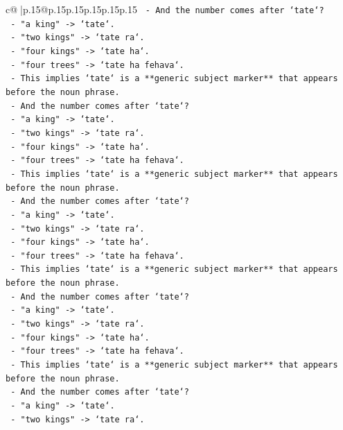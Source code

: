 \documentclass{article}
\begin{document}
{\begin{supertabular}{c@{$\;$}|p{.15\linewidth}@{}p{.15\linewidth}p{.15\linewidth}p{.15\linewidth}p{.15\linewidth}p{.15\linewidth}}
{{{\texttt{    {-} And the number comes after `tate`?} \\
\texttt{    {-} "a king" {-}> `tate`.} \\
\texttt{    {-} "two kings" {-}> `tate ra`.} \\
\texttt{    {-} "four kings" {-}> `tate ha`.} \\
\texttt{    {-} "four trees" {-}> `tate ha fehava`.} \\
\texttt{    {-} This implies `tate` is a **generic subject marker** that appears before the noun phrase.} \\
\texttt{    {-} And the number comes after `tate`?} \\
\texttt{    {-} "a king" {-}> `tate`.} \\
\texttt{    {-} "two kings" {-}> `tate ra`.} \\
\texttt{    {-} "four kings" {-}> `tate ha`.} \\
\texttt{    {-} "four trees" {-}> `tate ha fehava`.} \\
\texttt{    {-} This implies `tate` is a **generic subject marker** that appears before the noun phrase.} \\
\texttt{    {-} And the number comes after `tate`?} \\
\texttt{    {-} "a king" {-}> `tate`.} \\
\texttt{    {-} "two kings" {-}> `tate ra`.} \\
\texttt{    {-} "four kings" {-}> `tate ha`.} \\
\texttt{    {-} "four trees" {-}> `tate ha fehava`.} \\
\texttt{    {-} This implies `tate` is a **generic subject marker** that appears before the noun phrase.} \\
\texttt{    {-} And the number comes after `tate`?} \\
\texttt{    {-} "a king" {-}> `tate`.} \\
\texttt{    {-} "two kings" {-}> `tate ra`.} \\
\texttt{    {-} "four kings" {-}> `tate ha`.} \\
\texttt{    {-} "four trees" {-}> `tate ha fehava`.} \\
\texttt{    {-} This implies `tate` is a **generic subject marker** that appears before the noun phrase.} \\
\texttt{    {-} And the number comes after `tate`?} \\
\texttt{    {-} "a king" {-}> `tate`.} \\
\texttt{    {-} "two kings" {-}> `tate ra`.} \\
}}}
\end{supertabular}}
\end{document}
